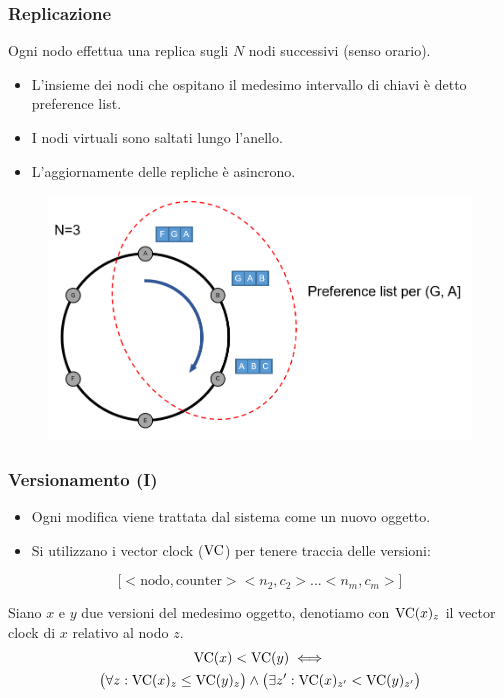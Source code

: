 \begin{frame}
  \frametitle{Replicazione}
  Ogni nodo effettua una replica sugli $N$ nodi successivi (senso orario).
  \begin{itemize}
  \item L'insieme dei nodi che ospitano il medesimo intervallo di chiavi è detto \alert{preference list}.
  \item I nodi virtuali sono saltati lungo l'anello.
  \item L'aggiornamente delle repliche è \alert{asincrono}.
  \end{itemize}
  \begin{figure}
  \centering
  \includegraphics[scale=0.35]{dynamo/replication.png}
  \end{figure}  
\end{frame}


\begin{frame}
  \frametitle{Versionamento (I)}
  \begin{itemize}
  \item Ogni modifica viene trattata dal sistema come un nuovo oggetto.
  \item Si utilizzano i \alert{vector clock} ($\mathrm{VC}$) per tenere traccia delle versioni:
  \end{itemize}
  \centering
    \[
    \big[<\mathrm{nodo}, \mathrm{counter}> <n_2, c_2> ... <n_m, c_m> \big]
    \]
    
  \begin{definizione}
    Siano $x$ e $y$ due versioni del medesimo oggetto, denotiamo con $\mathrm{VC}(x)_z$ il vector clock di $x$ relativo al nodo $z$.
    \begin{multline*}
    \mathrm{VC}(x) < \mathrm{VC}(y) \iff \\
      \big( \forall z \mathrel{:} \mathrm{VC}(x)_z \leq \mathrm{VC}(y)_z \big) \land \big( \exists z' \mathrel{:} \mathrm{VC}(x)_{z'} < \mathrm{VC}(y)_{z'} \big) 
    \end{multline*}
  \end{definizione}
\end{frame}


